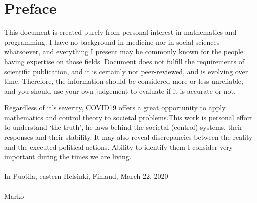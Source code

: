 \chapter{Preface}
This document is created purely from personal interest in mathematics and
programming. I have no background in medicine nor in social sciences
whatsoever, and everything I present may be commonly known for the people
having expertise on those fields. Document does not fulfill the requirements
of scientific publication, and it is certainly not peer-reviewed, and is
evolving over time. Therefore, the information should be considered more or
less unreliable, and you should use your own judgement to evaluate if it is
accurate or not. 

Regardless of it's
severity, COVID19 offers a great opportunity to apply mathematics and control
theory to societal problems.This work is personal effort to understand `the
truth', he laws behind the societal (control) systems, their responses and
their stability.  It may also reveal discrepancies between the reality and the
executed political actions. Ability to identify them I consider very important
during the times we are living.
\\
\\
In Puotila, eastern Helsinki, Finland, March 22, 2020\\
\\
Marko


